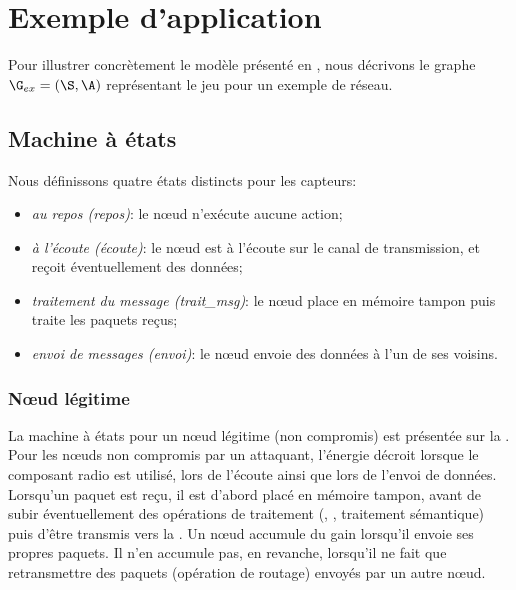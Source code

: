 \section{Exemple d'application}
\label{tj:sec:example}
Pour illustrer concrètement le modèle présenté en , nous décrivons le graphe $\G_{ex} = (\S,\A)$ représentant le jeu pour un exemple de réseau.

    \subsection{Machine à états}

\newcommand\idle         {\textsf{repos}\xspace}
\newcommand\listen       {\textsf{écoute}\xspace}
\newcommand\treatmsg     {\textsf{trait\_msg}\xspace}
\newcommand\treatnlmsg   {\textsf{trait}\\\textsf{msg}\xspace}
\newcommand\send         {\textsf{envoi}\xspace}
\newcommand\resend       {\textsf{renvoi}\xspace}
\newcommand\startsend    {\textsf{déb\_envoi}\xspace}
\newcommand\stopsend     {\textsf{fin\_envoi}\xspace}
\newcommand\startlisten  {\textsf{déb\_écoute}\xspace}
\newcommand\srlisten     {\textsf{déb\_éc.}\xspace}
\newcommand\stoplisten   {\textsf{fin\_écoute}\xspace}
\newcommand\startreceive {\textsf{déb\_réception}\xspace}
\newcommand\starttransmit{\textsf{déb\_retransmission}\xspace}
\newcommand\hold         {\textsf{attente}\xspace}
\newcommand\remainidle   {\textsf{cont\_repos}\xspace}
\newcommand\ignore       {\textsf{ignorer\_msg}\xspace}
Nous définissons quatre états distincts pour les capteurs:
\begin{itemize}
    \item \emph{au repos (\idle)}: le nœud n'exécute aucune action;
    \item \emph{à l'écoute (\listen)}: le nœud est à l'écoute sur le canal de transmission, et reçoit éventuellement des données;
    \item \emph{traitement du message (\treatmsg)}: le nœud place en mémoire tampon puis traite les paquets reçus;
    \item \emph{envoi de messages (\send)}: le nœud envoie des données à l'un de ses voisins.
\end{itemize}

        \subsubsection{Nœud légitime}
La machine à états pour un nœud légitime (non compromis) est présentée sur la .
Pour les nœuds non compromis par un attaquant, l'énergie décroit lorsque le composant radio est utilisé, \cad lors de l'écoute ainsi que lors de l'envoi de données.
Lorsqu'un paquet est reçu, il est d'abord placé en mémoire tampon, avant de subir éventuellement des opérations de traitement (, , traitement sémantique) puis d'être transmis vers la \sdb.
Un nœud accumule du gain lorsqu'il envoie ses propres paquets.
Il n'en accumule pas, en revanche, lorsqu'il ne fait que retransmettre des paquets (opération de routage) envoyés par un autre nœud.

